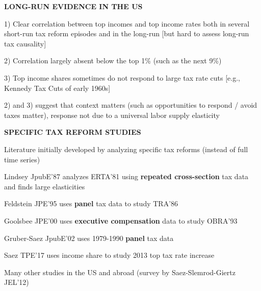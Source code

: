 \documentclass[landscape]{slides}
\begin{document}
\begin{slide}
\begin{center}
{\bf LONG-RUN EVIDENCE IN THE US}
\end{center}
1) Clear correlation between top incomes and top income rates both
in several short-run tax reform episodes and in the long-run [but
hard to assess long-run tax causality]

2) Correlation largely absent below the top 1\% (such as the next
9\%)

3) Top income shares sometimes do not respond to large tax rate
cuts [e.g., Kennedy Tax Cuts of early 1960s]

2) and 3) suggest that context matters (such as opportunities to respond / avoid taxes matter),
response not due to a universal labor supply elasticity


\end{slide}

\begin{slide}
\begin{center}
{\bf SPECIFIC TAX REFORM STUDIES}
\end{center}
Literature initially developed by analyzing specific tax reforms (instead of
full time series)

Lindsey JpubE'87 analyzes ERTA'81 using {\bf repeated
cross-section} tax data and finds large elasticities

Feldstein JPE'95 uses {\bf panel} tax data to study TRA'86

Goolsbee JPE'00 uses {\bf executive compensation} data to study
OBRA'93

Gruber-Saez JpubE'02 uses 1979-1990 {\bf panel} tax data 

Saez TPE'17 uses income share to study 2013 top tax rate increase


Many other studies in the US and abroad (survey by Saez-Slemrod-Giertz JEL'12)
\end{slide}
\end{document}
